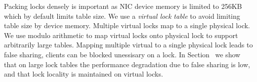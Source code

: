 Packing locks densely is important as NIC device memory is
limited to 256KB which by default limits table size. We use
a \textit{virtual lock table} to avoid limiting table size
by device memory.  Multiple virtual locks map to a single
physical lock. We use modulo arithmetic to map virtual locks
onto physical lock to support arbitrarily large tables.
Mapping multiple virtual to a single physical lock leads to
false sharing, clients can be blocked unessisary on a lock.
In Section~ we show that on large lock tables the
performance degradation due to false sharing is low, and
that lock locality is maintained on virtual locks.






